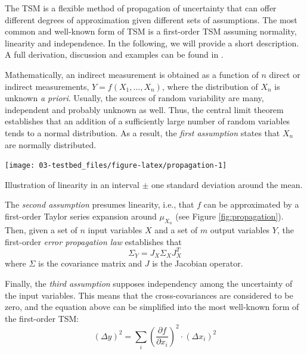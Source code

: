 \documentclass[twoside,nohyper]{tufte-book}
\theoremstyle{definition}
\theoremstyle{definition}
\theoremstyle{definition}
\theoremstyle{remark}
\begin{document}
The TSM is a flexible method of propagation of uncertainty that can
offer different degrees of approximation given different sets of
assumptions. The most common and well-known form of TSM is a first-order
TSM assuming normality, linearity and independence. In the following, we
will provide a short description. A full derivation, discussion and
examples can be found in \citet{Arras:1998}.

Mathematically, an indirect measurement is obtained as a function of
\(n\) direct or indirect measurements, \(Y = f(X_1, ..., X_n)\), where
the distribution of \(X_n\) is unknown \emph{a priori}. Usually, the
sources of random variability are many, independent and probably unknown
as well. Thus, the central limit theorem establishes that an addition of
a sufficiently large number of random variables tends to a normal
distribution. As a result, the \emph{first assumption} states that
\(X_n\) are normally distributed.




\begin{marginfigure}[-1in]

{\centering \texttt{[image: 03-testbed\_files/figure-latex/propagation-1]} 

}

\caption[Illustration of linearity in an interval \(\pm\) one
standard deviation around the mean.]{Illustration of linearity in an interval \(\pm\) one
standard deviation around the mean.}\label{fig:propagation}
\end{marginfigure}

The \emph{second assumption} presumes linearity, i.e., that \(f\) can be
approximated by a first-order Taylor series expansion around
\(\mu_{X_n}\) (see Figure \ref{fig:propagation}). Then, given a set of
\(n\) input variables \(X\) and a set of \(m\) output variables \(Y\),
the first-order \emph{error propagation law} establishes that
%
\begin{equation}
  \Sigma_Y = J_X \Sigma_X J_X^T \label{eq:assumption2}
\end{equation}
%
where \(\Sigma\) is the covariance matrix and \(J\) is the Jacobian
operator.

\pagebreak Finally, the \emph{third assumption} supposes independency
among the uncertainty of the input variables. This means that the
cross-covariances are considered to be zero, and the equation above can
be simplified into the most well-known form of the first-order TSM:
%
\begin{equation}
  \left(\Delta y\right)^2 = \sum_i \left(\frac{\partial f}{\partial x_i}\right)^2\cdot \left(\Delta x_i\right)^2 \label{eq:TSM}
\end{equation}
%
\end{document}
